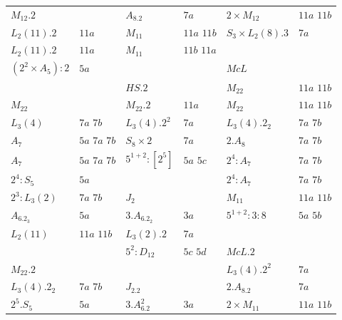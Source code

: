 \documentclass{article}
\theoremstyle{remark}
\theoremstyle{definition}
\begin{document}
\begin{table}
\begin{tabular}{ | l| l || l | l|| l| l|}
\underline{$M_{12}.2$}      &                   & $A_8.2$                & $7a$              & $2\times M_{12}$  & $11a$ $11b$ \\
$L_2(11).2 $                & $11a$             &$ M_{11}$               & $11a$ $11b$       & $S_3\times L_2(8).3$  & $7a$ \\
$L_2(11).2 $                & $11a$             & $ M_{11}$                 & $11b$ $11a$       &  &  \\
$(2^2\times A_5):2$         & $5a$              &                        &                   & \underline{$McL$} &  \\
                            &                   & \underline{$HS.2$}     &                   & $M_{22}$  & $11a$ $11b$ \\
\underline{$M_{22}$}        &                   & $M_{22}.2$                & $11a$             & $M_{22}$  & $11a$ $11b$ \\
$L_3(4)$                    & $7a$ $7b$         &$ L_3(4).2^2$           & $7a$              &$ L_3(4).2_2 $ & $7a$ $7b$ \\
$A_7$                       & $5a$ $7a$ $7b$    & $S_8\times 2 $          & $7a$              &$ 2.A_8 $ & $7a$ $7b$ \\
$A_7$                       & $5a$ $7a$ $7b$    & $5^{1+2}:[2^5]$               & $5a$ $5c$         & $2^4:A_7$  & $7a$ $7b$ \\
$2^4:S_5$                   & $5a$              &                        &                   & $2^4:A_7$  & $7a$ $7b$ \\
$2^3:L_3(2)$                & $7a$ $7b$         & \underline{$J_2$}      &                   & $M_{11}$  & $11a$ $11b$ \\
$A_6.2_3 $                  & $5a$              & $3.A_6.2_2$            & $3a$              & $5^{1+2}:3:8$  & $5a$ $5b$ \\
$L_2(11)$                   & $11a$ $11b$       & $L_3(2).2$             & $7a$              &  &  \\
                            &                   & $5^2:D_{12}$           & $5c$ $5d$         & \underline{$McL.2$} &  \\
\underline{$M_{22}.2 $}     &                   &                        &                   & $L_3(4).2^2$  & $7a$ \\
$L_3(4).2_2$                & $7a$ $7b$         & \underline{$J_2.2$}    &                   & $ 2.A_8.2 $  & $7a$ \\
$2^5.S_5$                   & $5a$              & $3.A_6.2^2$            & $3a$              & $2\times M_{11}$  & $11a$ $11b$ \\

\end{tabular}
\end{table}
\end{document}
